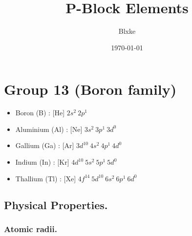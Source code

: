 \documentclass[twocolumn]{article}
\title{\textbf{P-Block Elements}}
\author{ Blxke }
\date{\today}
\begin{document}
\maketitle    


\section*{Group 13 (Boron family)}

\begin{itemize}
    \item Boron (B) : [He] \(2s^2 \ 2p^1\)
    \item Aluminium (Al) : [Ne] \(3s^2\ 3p^1\ 3d^0\)
    \item Gallium (Ga) : [Ar] \(3d^{10}\ 4s^2\ 4p^1\ 4d^0 \)
    \item Indium (In) : [Kr] \(4d^{10}\ 5s^2\ 5p^1\ 5d^0 \)
    \item Thallium (Tl) : [Xe] \(4f^{14}\ 5d^{10}\  6s^2\ 6p^1\ 6d^0\)       
\end{itemize}

\subsection*{Physical Properties.}

\subsubsection*{Atomic radii.}
\end{document}
